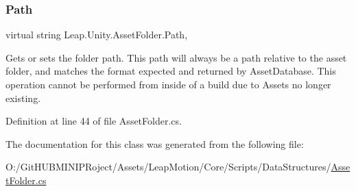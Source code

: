 \subsubsection{\texorpdfstring{Path}{Path}}
{\footnotesize\ttfamily virtual string Leap.\+Unity.\+Asset\+Folder.\+Path\hspace{0.3cm}{\ttfamily [get]}, {\ttfamily [set]}}



Gets or sets the folder path. This path will always be a path relative to the asset folder, and matches the format expected and returned by Asset\+Database. This operation cannot be performed from inside of a build due to Assets no longer existing. 



Definition at line 44 of file Asset\+Folder.\+cs.



The documentation for this class was generated from the following file\+:\begin{DoxyCompactItemize}
\item 
O\+:/\+Git\+H\+U\+B\+M\+I\+N\+I\+P\+Roject/\+Assets/\+Leap\+Motion/\+Core/\+Scripts/\+Data\+Structures/\mbox{\hyperlink{_asset_folder_8cs}{Asset\+Folder.\+cs}}\end{DoxyCompactItemize}
